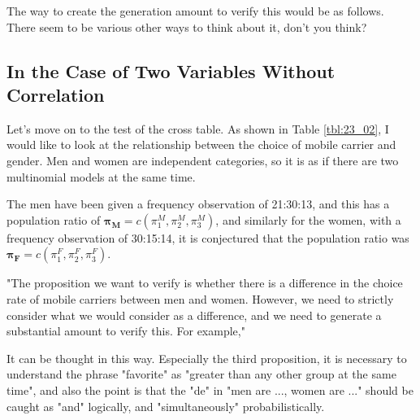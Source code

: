 \documentclass{ltjsbook}
\begin{document}
The way to create the generation amount to verify this would be as follows. There seem to be various other ways to think about it, don't you think?

\subsection{In the Case of Two Variables Without Correlation}
Let's move on to the test of the cross table. As shown in Table \ref{tbl:23_02}, I would like to look at the relationship between the choice of mobile carrier and gender.
Men and women are independent categories, so it is as if there are two multinomial models at the same time.

The men have been given a frequency observation of 21:30:13, and this has a population ratio of $\bm{\pi_M} = c(\pi_1^M,\pi_2^M,\pi_3^M)$, and similarly for the women, with a frequency observation of 30:15:14, it is conjectured that the population ratio was $\bm{\pi_F} = c(\pi_1^F,\pi_2^F,\pi_3^F)$.

"The proposition we want to verify is whether there is a difference in the choice rate of mobile carriers between men and women. However, we need to strictly consider what we would consider as a difference, and we need to generate a substantial amount to verify this. For example,"

It can be thought in this way. Especially the third proposition, it is necessary to understand the phrase "favorite" as "greater than any other group at the same time", and also the point is that the "de" in "men are ..., women are ..." should be caught as "and" logically, and "simultaneously" probabilistically.
\end{document}
